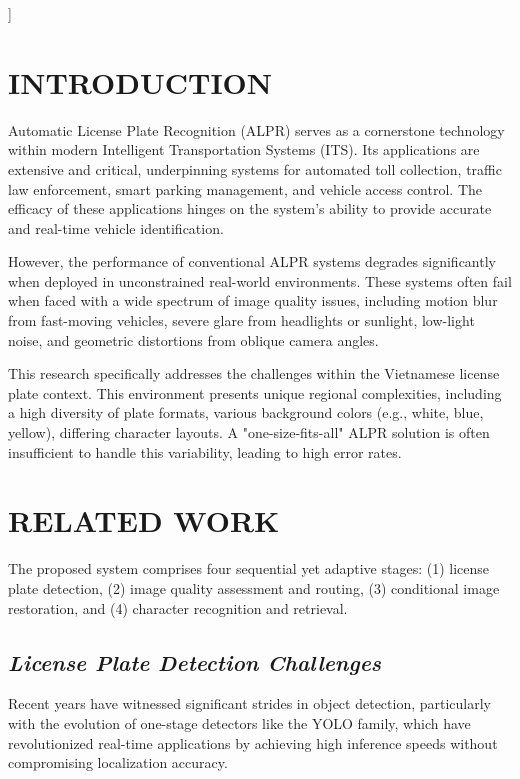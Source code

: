 \documentclass[a4paper,11pt,twocolumn]{article}
\begin{document}
	\vspace{1em}
	]
	
	
	\section{INTRODUCTION}
	
	Automatic License Plate Recognition (ALPR) serves as a cornerstone technology within modern Intelligent Transportation Systems (ITS). Its applications are extensive and critical, underpinning systems for automated toll collection, traffic law enforcement, smart parking management, and vehicle access control. The efficacy of these applications hinges on the system's ability to provide accurate and real-time vehicle identification.
	
	However, the performance of conventional ALPR systems degrades significantly when deployed in unconstrained real-world environments. These systems often fail when faced with a wide spectrum of image quality issues, including motion blur from fast-moving vehicles, severe glare from headlights or sunlight, low-light noise, and geometric distortions from oblique camera angles.
	
	This research specifically addresses the challenges within the Vietnamese license plate context. This environment presents unique regional complexities, including a high diversity of plate formats, various background colors (e.g., white, blue, yellow), differing character layouts. A "one-size-fits-all" ALPR solution is often insufficient to handle this variability, leading to high error rates.
	
	\section{RELATED WORK}
	
	The proposed system comprises four sequential yet adaptive stages: (1) license plate detection, (2) image quality assessment and routing, (3) conditional image restoration, and (4) character recognition and retrieval.
	
	\subsection{\textit{License Plate Detection Challenges}}
	
	Recent years have witnessed significant strides in object detection, particularly with the evolution of one-stage detectors like the YOLO family, which have revolutionized real-time applications by achieving high inference speeds without compromising localization accuracy.
	
\end{document}
